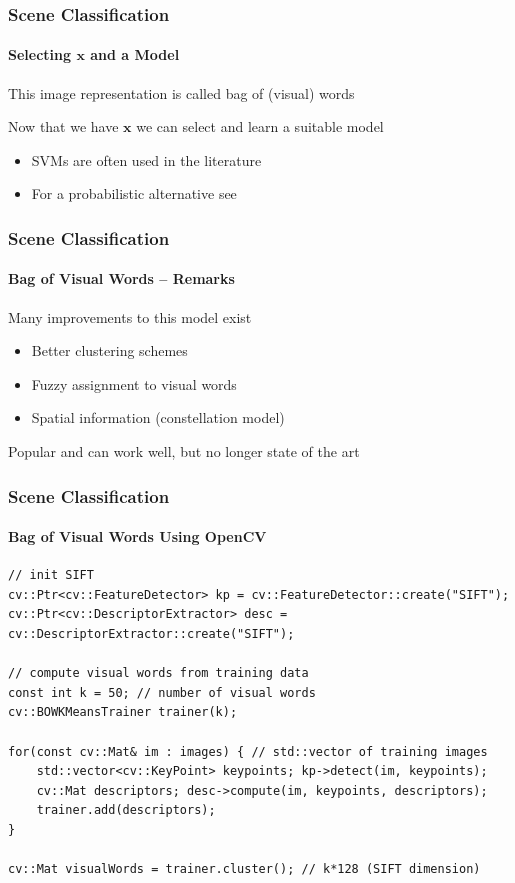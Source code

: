 \documentclass[xetex,professionalfont]{beamer}
\renewcommand{\vec}[1]{\ensuremath{\mathbf{#1}}}
\newcommand{\vx}{\vec{x}}
\renewcommand\emph[1]{\textcolor{tuwcvl_inf_red}{#1}}
\begin{document}

\begin{frame}
\frametitle{Scene Classification}
\framesubtitle{Selecting $\vx$ and a Model}

This image representation is called \emph{bag of (visual) words}

\bigskip
Now that we have $\vx$ we can select and learn a suitable model
\begin{itemize}
    \item SVMs are often used in the literature
    \item For a probabilistic alternative see \cite{prince12}
\end{itemize}

\end{frame}


\begin{frame}
\frametitle{Scene Classification}
\framesubtitle{Bag of Visual Words -- Remarks}

Many improvements to this model exist
\begin{itemize}
    \item Better clustering schemes
    \item Fuzzy assignment to visual words
    \item Spatial information (constellation model)
\end{itemize}

\bigskip
Popular and can work well, but no longer state of the art %

\end{frame}


\begin{frame}[fragile]
\frametitle{Scene Classification}
\framesubtitle{Bag of Visual Words Using OpenCV}

\footnotesize

\begin{verbatim}
// init SIFT
cv::Ptr<cv::FeatureDetector> kp = cv::FeatureDetector::create("SIFT");
cv::Ptr<cv::DescriptorExtractor> desc = cv::DescriptorExtractor::create("SIFT");

// compute visual words from training data
const int k = 50; // number of visual words
cv::BOWKMeansTrainer trainer(k);

for(const cv::Mat& im : images) { // std::vector of training images
    std::vector<cv::KeyPoint> keypoints; kp->detect(im, keypoints);
    cv::Mat descriptors; desc->compute(im, keypoints, descriptors);
    trainer.add(descriptors);
}

cv::Mat visualWords = trainer.cluster(); // k*128 (SIFT dimension)
\end{verbatim}

\end{frame}
\end{document}

